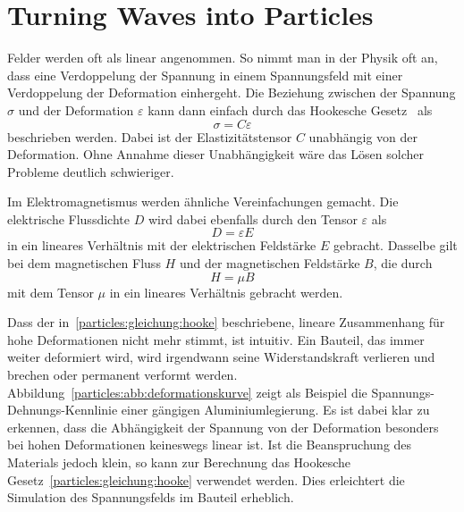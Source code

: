 %
%
%
%
\newcommand{\mytodo}[1]{\textbf{\textcolor{red}{TODO: #1}}}
\newcommand{\mynote}[1]{\textbf{\textcolor{orange}{NOTE: #1}}}
\chapter{Turning Waves into Particles\label{chapter:particles}}
\begin{refsection}

Felder werden oft als linear angenommen. 
So nimmt man in der Physik oft an, dass eine Verdoppelung der Spannung in einem Spannungsfeld mit einer Verdoppelung der Deformation einhergeht.
Die Beziehung zwischen der Spannung $\sigma$ und der Deformation $\varepsilon$ kann dann einfach durch das Hookesche Gesetz~\cite{todo} als
\[
    \sigma = C \varepsilon \label{particles:gleichung:hooke}
\]
beschrieben werden. %
Dabei ist der Elastizitätstensor $C$ unabhängig von der Deformation.
Ohne Annahme dieser Unabhängigkeit wäre das Lösen solcher Probleme deutlich schwieriger.

Im Elektromagnetismus werden ähnliche Vereinfachungen gemacht. 
Die elektrische Flussdichte $D$ wird dabei ebenfalls durch den Tensor $\varepsilon$ als
\[
    D = \varepsilon E \label{particles:eq:D}
\]
in ein lineares Verhältnis mit der elektrischen Feldstärke $E$ gebracht.
Dasselbe gilt bei dem magnetischen Fluss $H$ und der magnetischen Feldstärke $B$, die durch
\[
    H = \mu B \label{particles:eq:H}
\]
mit dem Tensor $\mu$ in ein lineares Verhältnis gebracht werden.

Dass der in~\ref{particles:gleichung:hooke} beschriebene, lineare Zusammenhang für hohe Deformationen nicht mehr stimmt, ist intuitiv.
Ein Bauteil, das immer weiter deformiert wird, wird irgendwann seine Widerstandskraft verlieren und brechen oder permanent verformt werden.
Abbildung~\ref{particles:abb:deformationskurve} zeigt als Beispiel die Spannungs-Dehnungs-Kennlinie einer gängigen Aluminiumlegierung. %
Es ist dabei klar zu erkennen, dass die Abhängigkeit der Spannung von der Deformation besonders bei hohen Deformationen keineswegs linear ist.
Ist die Beanspruchung des Materials jedoch klein, so kann zur Berechnung das Hookesche Gesetz~\ref{particles:gleichung:hooke} verwendet werden.
Dies erleichtert die Simulation des Spannungsfelds im Bauteil erheblich.


\end{refsection}

